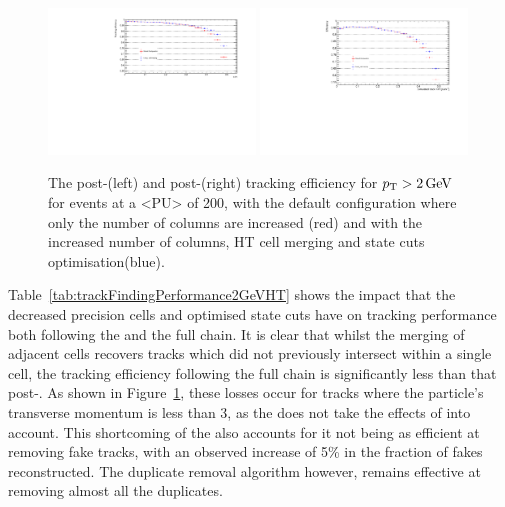 \begin{figure}[tbp]
\centering
\includegraphics[width=0.49\textwidth]{figs/tk-upgrade/results-lowPtTracking/htTrackingEffVsInvPtFlatGeometry_5000.pdf}
\includegraphics[width=0.49\textwidth]{figs/tk-upgrade/results-lowPtTracking/kfTrackingEffVsInvPtFlatGeometry_5000.pdf}
\caption{The post-\HT (left) and post-\KF (right) tracking efficiency for $p_{\mathrm{T}} > 2\,\text{Ge\hspace{-.08em}V}$ for \ttbar events at a <PU> of 200, with the default configuration where only the number of \qpt columns are increased (red) and with the increased number of columns, HT cell merging and \KF state cuts optimisation(blue).
}
\label{fig:2GeVFlatEff}	
\end{figure}

Table~\ref{tab:trackFindingPerformance2GeVHT} shows the impact that the decreased precision \HT cells and optimised \KF state cuts have on tracking performance both following the \HT and the full chain.
It is clear that whilst the merging of adjacent \HT cells recovers  tracks which did not previously intersect within a single \HT cell, the tracking efficiency following the full chain is significantly less than that post-\HT.
As shown in Figure~\ref{fig:2GeVFlatEff}, these losses occur for tracks where the particle's transverse momentum is less than 3\GeV, as the \KF does not take the effects of \MS into account.
This shortcoming of the \KF also accounts for it not being as efficient at removing fake tracks, with an observed increase of 5\% in the fraction of fakes reconstructed.
The duplicate removal algorithm however, remains effective at removing almost all the duplicates.


